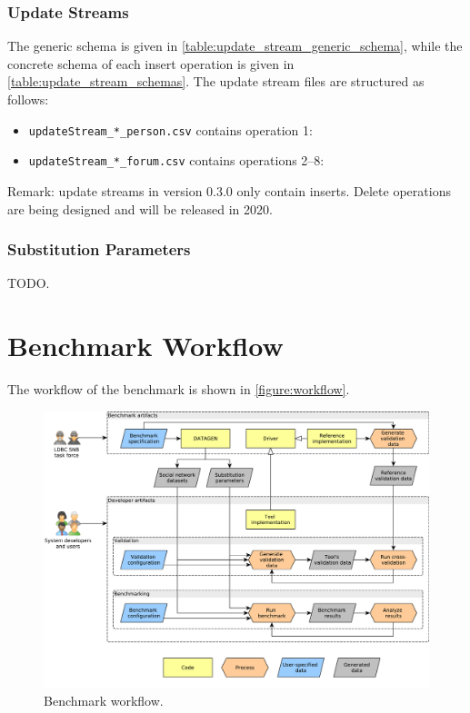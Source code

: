 \subsubsection{Update Streams}



The generic schema is given in \autoref{table:update_stream_generic_schema}, while the concrete schema of each insert operation is given in \autoref{table:update_stream_schemas}.
The update stream files are structured as follows:

\begin{itemize}
	\item \texttt{updateStream\_*\_person.csv} contains operation 1: 
	\item \texttt{updateStream\_*\_forum.csv} contains operations 2--8: %
\end{itemize}

Remark: update streams in version 0.3.0 only contain inserts. Delete operations are being designed and will be released in 2020.

\subsubsection{Substitution Parameters}

TODO.


\section{Benchmark Workflow}
\label{section:workflow}

The workflow of the benchmark is shown in \autoref{figure:workflow}.

\begin{figure}[htbp]
	\centering
	\includegraphics[width=\linewidth]{figures/workflow}
	\caption{Benchmark workflow.}
	\label{figure:workflow}
\end{figure}
